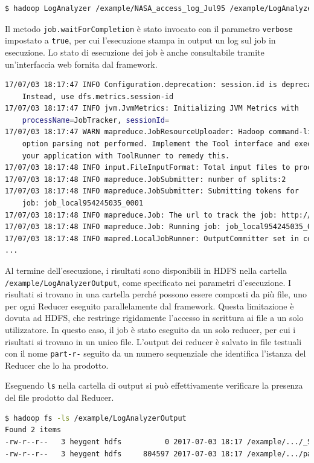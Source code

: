 \documentclass[italian,a4paper, twoside, 12pt]{report}
\begin{document}
\begin{lstlisting}[language=sh]
$ hadoop LogAnalyzer /example/NASA_access_log_Jul95 /example/LogAnalyzerOutput
\end{lstlisting}

Il metodo \lstinline!job.waitForCompletion! è stato invocato con il
parametro \lstinline!verbose! impostato a \lstinline!true!, per cui
l'esecuzione stampa in output un log sul job in esecuzione. Lo stato di
esecuzione dei job è anche consultabile tramite un'interfaccia web
fornita dal framework.

\begin{lstlisting}[language=sh]
17/07/03 18:17:47 INFO Configuration.deprecation: session.id is deprecated.
    Instead, use dfs.metrics.session-id
17/07/03 18:17:47 INFO jvm.JvmMetrics: Initializing JVM Metrics with 
    processName=JobTracker, sessionId=
17/07/03 18:17:47 WARN mapreduce.JobResourceUploader: Hadoop command-line 
    option parsing not performed. Implement the Tool interface and execute
    your application with ToolRunner to remedy this.
17/07/03 18:17:48 INFO input.FileInputFormat: Total input files to process : 1
17/07/03 18:17:48 INFO mapreduce.JobSubmitter: number of splits:2
17/07/03 18:17:48 INFO mapreduce.JobSubmitter: Submitting tokens for 
    job: job_local954245035_0001
17/07/03 18:17:48 INFO mapreduce.Job: The url to track the job: http://localhost:8080/
17/07/03 18:17:48 INFO mapreduce.Job: Running job: job_local954245035_0001
17/07/03 18:17:48 INFO mapred.LocalJobRunner: OutputCommitter set in config null
...
\end{lstlisting}

Al termine dell'esecuzione, i risultati sono disponibili in HDFS nella
cartella \lstinline!/example/LogAnalyzerOutput!, come specificato nei
parametri d'esecuzione. I risultati si trovano in una cartella perché
possono essere composti da più file, uno per ogni Reducer eseguito
parallelamente dal framework. Questa limitazione è dovuta ad HDFS, che
restringe rigidamente l'accesso in scrittura ai file a un solo
utilizzatore. In questo caso, il job è stato eseguito da un solo
reducer, per cui i risultati si trovano in un unico file. L'output dei
reducer è salvato in file testuali con il nome \lstinline!part-r-!
seguito da un numero sequenziale che identifica l'istanza del Reducer
che lo ha prodotto.

Eseguendo \lstinline!ls! nella cartella di output si può effettivamente
verificare la presenza del file prodotto dal Reducer.

\begin{lstlisting}[language=sh]
$ hadoop fs -ls /example/LogAnalyzerOutput
Found 2 items
-rw-r--r--   3 heygent hdfs          0 2017-07-03 18:17 /example/.../_SUCCESS
-rw-r--r--   3 heygent hdfs     804597 2017-07-03 18:17 /example/.../part-r-0000
\end{lstlisting}
\end{document}
